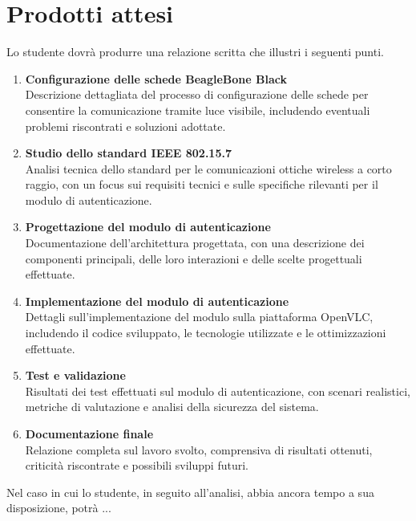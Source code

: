 \section*{Prodotti attesi}
Lo studente dovrà produrre una relazione scritta che illustri i seguenti punti.
\begin{enumerate}
    \item \textbf{Configurazione delle schede BeagleBone Black} \\
    Descrizione dettagliata del processo di configurazione delle schede per consentire la comunicazione tramite luce visibile, includendo eventuali problemi riscontrati e soluzioni adottate.
    
    \item \textbf{Studio dello standard IEEE 802.15.7} \\
    Analisi tecnica dello standard per le comunicazioni ottiche wireless a corto raggio, con un focus sui requisiti tecnici e sulle specifiche rilevanti per il modulo di autenticazione.
    
    \item \textbf{Progettazione del modulo di autenticazione} \\
    Documentazione dell'architettura progettata, con una descrizione dei componenti principali, delle loro interazioni e delle scelte progettuali effettuate.
    
    \item \textbf{Implementazione del modulo di autenticazione} \\
    Dettagli sull'implementazione del modulo sulla piattaforma OpenVLC, includendo il codice sviluppato, le tecnologie utilizzate e le ottimizzazioni effettuate.
    
    \item \textbf{Test e validazione} \\
    Risultati dei test effettuati sul modulo di autenticazione, con scenari realistici, metriche di valutazione e analisi della sicurezza del sistema.
    
    \item \textbf{Documentazione finale} \\
    Relazione completa sul lavoro svolto, comprensiva di risultati ottenuti, criticità riscontrate e possibili sviluppi futuri.
\end{enumerate}

Nel caso in cui lo studente, in seguito all'analisi, abbia ancora tempo a sua disposizione, potrà ...
